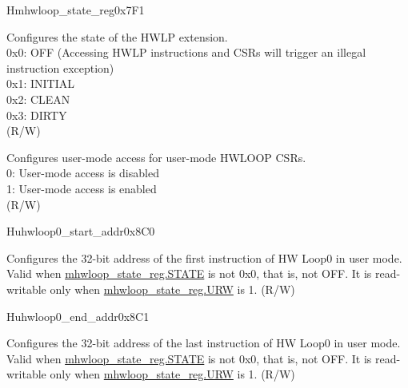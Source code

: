\begin{register}{H}{mhwloop\_state\_reg}{0x7F1}\label{regdesc:mhwlp_state_reg}
%
%
%
\regnewline%
\begin{regdesc}\begin{reglist}
\label{fielddesc:HWSTATE}\item [STATE] Configures the state of the HWLP extension.\\
0x0: OFF (Accessing HWLP instructions and CSRs will trigger an illegal instruction exception)\\
0x1: INITIAL\\
0x2: CLEAN\\
0x3: DIRTY\\
(R/W)
\label{fielddesc:URW}\item [URW] Configures user-mode access for user-mode HWLOOP CSRs. \\
0: User-mode access is disabled\\
1: User-mode access is enabled \\
(R/W)
\end{reglist}\end{regdesc}
\end{register}

\begin{register}{H}{uhwloop0\_start\_addr}{0x8C0}\label{regdesc:uhloop0_start_addr}
%
\regnewline%
\begin{regdesc}\begin{reglist}
\label{fielddesc:UHWLP0_SA}\item [SA] Configures the 32-bit address of the first instruction of HW Loop0 in user mode. Valid when \hyperref[fielddesc:HWSTATE]{mhwloop\_state\_reg.STATE} is not 0x0, that is, not OFF. It is read-writable only when \hyperref[fielddesc:HWSTATE]{mhwloop\_state\_reg.URW} is 1. (R/W)
\end{reglist}\end{regdesc}
\end{register}

\begin{register}{H}{uhwloop0\_end\_addr}{0x8C1}\label{regdesc:uhloop0_end_addr}
%
\regnewline%
\begin{regdesc}\begin{reglist}
\label{fielddesc:UHWLP0_EA}\item [EA] Configures the 32-bit address of the last instruction of HW Loop0 in user mode. Valid when \hyperref[fielddesc:HWSTATE]{mhwloop\_state\_reg.STATE} is not 0x0, that is, not OFF. It is read-writable only when \hyperref[fielddesc:HWSTATE]{mhwloop\_state\_reg.URW} is 1. (R/W)
\end{reglist}\end{regdesc}
\end{register}

